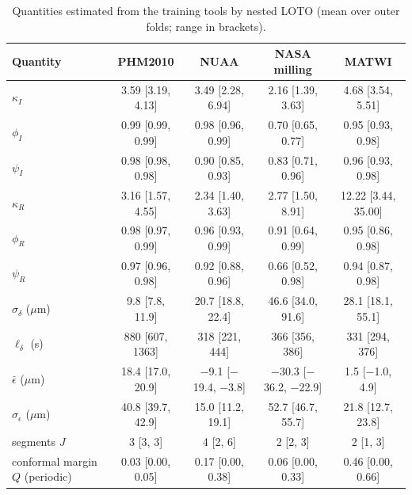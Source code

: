 \begin{table}[!tbp]
\centering
\caption{Quantities estimated from the training tools by nested LOTO (mean over outer folds; range in brackets).}
\label{tab:params}
\footnotesize\setlength{\tabcolsep}{3pt}
\begin{tabular}{lcccc}
\toprule
Quantity & PHM2010 & NUAA & NASA milling & MATWI\\
\midrule
$\kappa_I$ & 3.59 [3.19, 4.13] & 3.49 [2.28, 6.94] & 2.16 [1.39, 3.63] & 4.68 [3.54, 5.51]\\
$\phi_I$ & 0.99 [0.99, 0.99] & 0.98 [0.96, 0.99] & 0.70 [0.65, 0.77] & 0.95 [0.93, 0.98]\\
$\psi_I$ & 0.98 [0.98, 0.98] & 0.90 [0.85, 0.93] & 0.83 [0.71, 0.96] & 0.96 [0.93, 0.98]\\
$\kappa_R$ & 3.16 [1.57, 4.55] & 2.34 [1.40, 3.63] & 2.77 [1.50, 8.91] & 12.22 [3.44, 35.00]\\
$\phi_R$ & 0.98 [0.97, 0.99] & 0.96 [0.93, 0.99] & 0.91 [0.64, 0.99] & 0.95 [0.86, 0.98]\\
$\psi_R$ & 0.97 [0.96, 0.98] & 0.92 [0.88, 0.96] & 0.66 [0.52, 0.98] & 0.94 [0.87, 0.98]\\
$\sigma_\delta$ ($\mu$m) & 9.8 [7.8, 11.9] & 20.7 [18.8, 22.4] & 46.6 [34.0, 91.6] & 28.1 [18.1, 55.1]\\
$\ell_\delta$ (s) & 880 [607, 1363] & 318 [221, 444] & 366 [356, 386] & 331 [294, 376]\\
$\bar\epsilon$ ($\mu$m) & 18.4 [17.0, 20.9] & $-$9.1 [$-$19.4, $-$3.8] & $-$30.3 [$-$36.2, $-$22.9] & 1.5 [$-$1.0, 4.9]\\
$\sigma_\epsilon$ ($\mu$m) & 40.8 [39.7, 42.9] & 15.0 [11.2, 19.1] & 52.7 [46.7, 55.7] & 21.8 [12.7, 23.8]\\
segments $J$ & 3 [3, 3] & 4 [2, 6] & 2 [2, 3] & 2 [1, 3]\\
conformal margin $Q$ (periodic) & 0.03 [0.00, 0.05] & 0.17 [0.00, 0.38] & 0.06 [0.00, 0.33] & 0.46 [0.00, 0.66]\\
\bottomrule
\end{tabular}
\end{table}